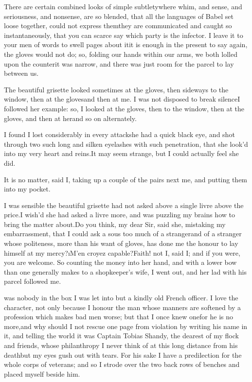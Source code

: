 \documentclass[twoside]{article}
\begin{document}
There are certain combined looks of simple subtlety\tsk where whim, and
sense, and seriousness, and nonsense, are so blended, that all the
languages of Babel set loose together, could not express them\tsk they are
communicated and caught so instantaneously, that you can scarce say which
party is the infector.  I leave it to your men of words to swell pages
about it\tsk it is enough in the present to say again, the gloves would not
do; so, folding our hands within our arms, we both lolled upon the
counter\tsk it was narrow, and there was just room for the parcel to lay
between us.

The beautiful grisette looked sometimes at the gloves, then sideways to
the window, then at the gloves\tsk and then at me.  I was not disposed to
break silence\tsk I followed her example: so, I looked at the gloves, then
to the window, then at the gloves, and then at her\tsk and so on
alternately.

I found I lost considerably in every attack\tsk she had a quick black eye,
and shot through two such long and silken eyelashes with such
penetration, that she look’d into my very heart and reins.\tsk It may seem
strange, but I could actually feel she did.\tsk 

It is no matter, said I, taking up a couple of the pairs next me, and
putting them into my pocket.

I was sensible the beautiful grisette had not asked above a single livre
above the price.\tsk I wish’d she had asked a livre more, and was puzzling my
brains how to bring the matter about.\tsk Do you think, my dear Sir, said
she, mistaking my embarrassment, that I could ask a sous too much of a
stranger\tsk and of a stranger whose politeness, more than his want of
gloves, has done me the honour to lay himself at my mercy?\tsk \i{M’en croyez
capable}?\tsk Faith! not I, said I; and if you were, you are welcome.  So
counting the money into her hand, and with a lower bow than one generally
makes to a shopkeeper’s wife, I went out, and her lad with his parcel
followed me.






 was nobody in the box I was let into but a kindly old French
officer.  I love the character, not only because I honour the man whose
manners are softened by a profession which makes bad men worse; but that
I once knew one\tsk for he is no more,\tsk and why should I not rescue one page
from violation by writing his name in it, and telling the world it was
Captain Tobias Shandy, the dearest of my flock and friends, whose
philanthropy I never think of at this long distance from his death\tsk but my
eyes gush out with tears.  For his sake I have a predilection for the
whole corps of veterans; and so I strode over the two back rows of
benches and placed myself beside him.
\end{document}
